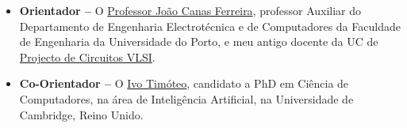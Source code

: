 \documentclass[a4paper, onecolumn, 10pt]{article}
\begin{document}
	\begin{itemize}
		\item
			\textbf{Orientador --} O \href{https://sigarra.up.pt/feup/pt/func_geral.formview?p_codigo=210963}{Professor João Canas Ferreira}, professor Auxiliar do Departamento de Engenharia Electrotécnica e de Computadores da Faculdade de Engenharia da Universidade do Porto, e meu antigo docente da UC de \href{https://sigarra.up.pt/feup/pt/UCURR_GERAL.FICHA_UC_VIEW?pv_ocorrencia_id=352359}{Projecto de Circuitos VLSI}.
		\item
			\textbf{Co-Orientador --} O \href{http://www.cl.cam.ac.uk/~ijpdmt2/}{Ivo Timóteo}, candidato a PhD em Ciência de Computadores, na área de Inteligência Artificial, na Universidade de Cambridge, Reino Unido.
	
	\end{itemize}	
\end{document}
